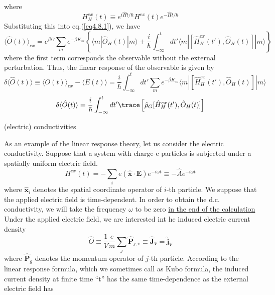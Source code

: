 where
\begin{equation}
H_H^{ex}(t) \equiv e^{i\hat Ht/\hbar} H^{ex} (t) e^{-\hat H t/\hbar}
\end{equation}
 Substituting this into eq.(\ref{eq4.8.1}), we have
\[
\langle \hat O(t)\rangle_{ex}=e^{\beta\Omega} \sum_m e^{-\beta K_m} \left\{ \langle m|\hat O_H(t)|m\rangle+\frac{i}{\hbar} \int_{-\infty}^t dt' \langle m|[\hat H_H^{ex}(t'),\hat O_H(t)]|m\rangle \right\}
\]
where the first term corresponds the observable without the external perturbation.
 Thus, the linear response of the observable is given by 
\[
\delta\langle\hat O(t)\rangle\equiv \langle O(t)\rangle_{ex}-\langle E(t)\rangle=\frac{i}{\hbar} \int_{-\infty}^t dt' \sum_m e^{-\beta K_m} \langle m|[\hat H_H^{ex}(t'),\hat O_H(t)]|m\rangle
\]
\begin{equation}\label{eq4.8.5}
\delta\langle\hat O(t)\rangle = \frac{i}{\hbar} \int_{-\infty}^t dt'\trace \left[ \hat \rho _G [\hat H_H^{ex}(t'),\hat O_H(t)]\right]
\end{equation}
\begin{center}
(electric) conductivities
\end{center}
 As an example of the linear response theory, let us consider the electric conductivity.
 Suppose that a system with charge-e particles is subjected under a spatially uniform electric field.
\begin{equation}
H^{ex}(t)=-\sum_i e(\hat{\mathbf{x}}\cdot \mathbf E) e^{-i\omega t}\equiv -\hat Ae^{-i\omega t}
\end{equation}
where $\hat {\mathbf{x}}_i$ denotes the spatial coordinate operator of $i$-th particle.
 We suppose that the applied electric field is time-dependent.
 In order to obtain the d.c. conductivity, we will take the frequency $\omega$ to be zero \uline{in the end of the calculation}
 Under the applied electric field, we are interested int he induced electric current density
\begin{equation}
\hat O\equiv \frac{1}{V} \frac{e}{m} \sum_j \hat{\mathbf{P}}_{j,v} \equiv \hat{\mathbf{J}}_V=\hat{\mathbf{j}}_V
\end{equation} 
where $\hat{\mathbf{P}}_g$ denotes the momentum operator of $j$-th particle.
 According to the linear response formula, which we sometimes call as Kubo formula, the induced current density at finite time ``t'' has the same time-dependence as the external electric field has
